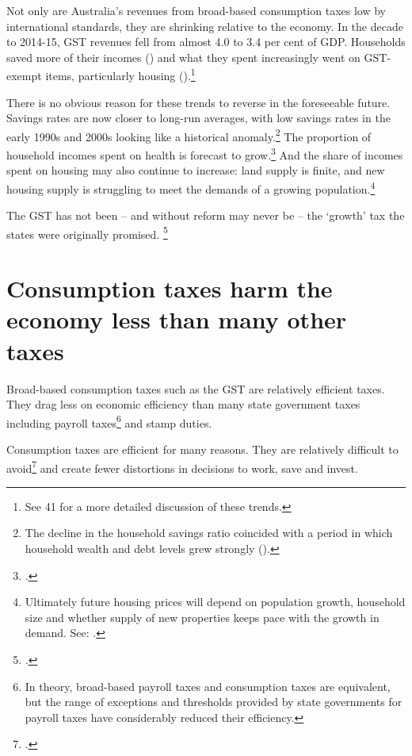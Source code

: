 Not only are Australia’s revenues from broad-based consumption taxes low by international standards, they are shrinking relative to the economy. In the decade to 2014-15, GST revenues fell from almost 4.0 to 3.4 per cent of GDP.  Households saved more of their incomes () and what they spent increasingly went on GST-exempt items, particularly housing ().\footnote{See \textcites{Treasury2014-Budget-Papers-2014-15}[][38--41]{PBO2014TrendsAustralianGovtReceipts1982to2013} 41 for a more detailed discussion of these trends.} 

There is no obvious reason for these trends to reverse in the foreseeable future. Savings rates are now closer to long-run averages, with low savings rates in the early 1990s and 2000s looking like a historical anomaly.\footnote{The decline in the household savings ratio coincided with a period in which household wealth and debt levels grew strongly (\textcite[][38]{PBO2014TrendsAustralianGovtReceipts1982to2013}).}  The proportion of household incomes spent on health is forecast to grow.\footcite[][28]{DaleyWoodWeidmannEtAl2014}  And the share of incomes spent on housing may also continue to increase: land supply is finite, and new housing supply is struggling to meet the demands of a growing population.\footnote{Ultimately future housing prices will depend on population growth, household size and whether supply of new properties keeps pace with the growth in demand. See: \textcite[][7]{RBA2014SubmissionAffordableHousingInquiry}.}

The GST has not been – and without reform may never be – the ‘growth’ tax the states were originally promised. \footcite{CostelloBudgetSpeech2000-01}

\section{Consumption taxes harm the economy less than many other taxes}\label{sec:GST-1-2}
Broad-based consumption taxes such as the GST are relatively efficient taxes. They drag less on economic efficiency than many state government taxes including payroll taxes\footnote{In theory, broad-based payroll taxes and consumption taxes are equivalent, but the range of exceptions and thresholds provided by state governments for payroll taxes have considerably reduced their efficiency.}  and stamp duties.  

Consumption taxes are efficient for many reasons. They are relatively difficult to avoid\footcite[][274]{HenryTaxReview2010}  and create fewer distortions in decisions to work, save and invest. 

